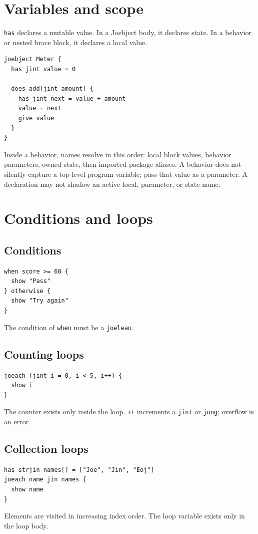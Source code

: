 \documentclass[11pt]{article}
\newcommand{\keyword}[1]{\texttt{#1}}
\begin{document}
\section{Variables and scope}
\keyword{has} declares a mutable value. In a Joebject body, it declares state. In a behavior or nested brace block, it declares a local value.

\begin{lstlisting}
joebject Meter {
  has jint value = 0

  does add(jint amount) {
    has jint next = value + amount
    value = next
    give value
  }
}
\end{lstlisting}

Inside a behavior, names resolve in this order: local block values, behavior parameters, owned state, then imported package aliases. A behavior does not silently capture a top-level program variable; pass that value as a parameter. A declaration may not shadow an active local, parameter, or state name.

\section{Conditions and loops}
\subsection{Conditions}
\begin{lstlisting}
when score >= 60 {
  show "Pass"
} otherwise {
  show "Try again"
}
\end{lstlisting}
The condition of \keyword{when} must be a \keyword{joelean}.

\subsection{Counting loops}
\begin{lstlisting}
joeach (jint i = 0, i < 5, i++) {
  show i
}
\end{lstlisting}
The counter exists only inside the loop. \keyword{++} increments a \keyword{jint} or \keyword{jong}; overflow is an error.

\subsection{Collection loops}
\begin{lstlisting}
has strjin names[] = ["Joe", "Jin", "Eoj"]
joeach name jin names {
  show name
}
\end{lstlisting}
Elements are visited in increasing index order. The loop variable exists only in the loop body.
\end{document}
